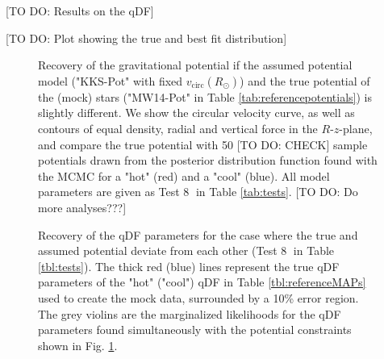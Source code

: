 
[TO DO: Results on the qDF]

[TO DO: Plot showing the true and best fit distribution]







\begin{figure}
\caption{Recovery of the gravitational potential if the assumed potential model ("KKS-Pot" with fixed $v_\text{circ}(R_\odot)$) and the true potential of the (mock) stars ("MW14-Pot" in Table \ref{tab:referencepotentials}) is slightly different. We show the circular velocity curve, as well as contours of equal density, radial and vertical force in the $R$-$z$-plane, and compare the true potential with 50 [TO DO: CHECK] sample potentials drawn from the posterior distribution function found with the MCMC for a "hot" (red) and a "cool" \MAP (blue). All model parameters are given as Test \textcircled{8} in Table \ref{tab:tests}. [TO DO: Do more analyses???]}
\label{fig:MW14vsKKS2SphFlex}
\end{figure}

\begin{figure}
\caption{Recovery of the qDF parameters for the case where the true and assumed potential deviate from each other (Test \textcircled{8} in Table \ref{tbl:tests}). The thick red (blue) lines represent the true qDF parameters of the "hot" ("cool") qDF in Table \ref{tbl:referenceMAPs} used to create the mock data, surrounded by a 10\% error region. The grey violins are the marginalized likelihoods for the qDF parameters found simultaneously with the potential constraints shown in Fig. \ref{fig:MW14vsKKS2SphFlex}.}
\label{fig:MW14vsKKS2SphFlex_violins}
\end{figure}






